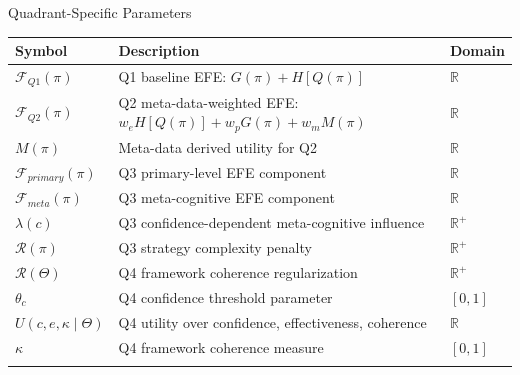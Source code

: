 \documentclass[
  ignorenonframetext,
]{beamer}
\newcounter{none} %
\begin{document}
\begin{frame}{Quadrant-Specific Parameters}
\protect{}\label{quadrant-specific-parameters}
{\def\LTcaptype{none} %
\begin{longtable}[]{@{}
  >{\raggedright\arraybackslash}p{}
  >{\raggedright\arraybackslash}p{}
  >{\raggedright\arraybackslash}p{}@{}}
\toprule\noalign{}
\begin{minipage}[b]{\linewidth}\raggedright
Symbol
\end{minipage} & \begin{minipage}[b]{\linewidth}\raggedright
Description
\end{minipage} & \begin{minipage}[b]{\linewidth}\raggedright
Domain
\end{minipage} \\
\midrule\noalign{}
\endhead
\(\mathcal{F}_{Q1}(\pi)\) & Q1 baseline EFE: \(G(\pi) + H[Q(\pi)]\) &
\(\mathbb{R}\) \\
\(\mathcal{F}_{Q2}(\pi)\) & Q2 meta-data-weighted EFE:
\(w_e H[Q(\pi)] + w_p G(\pi) + w_m M(\pi)\) & \(\mathbb{R}\) \\
\(M(\pi)\) & Meta-data derived utility for Q2 & \(\mathbb{R}\) \\
\(\mathcal{F}_{primary}(\pi)\) & Q3 primary-level EFE component &
\(\mathbb{R}\) \\
\(\mathcal{F}_{meta}(\pi)\) & Q3 meta-cognitive EFE component &
\(\mathbb{R}\) \\
\(\lambda(c)\) & Q3 confidence-dependent meta-cognitive influence &
\(\mathbb{R}^+\) \\
\(\mathcal{R}(\pi)\) & Q3 strategy complexity penalty &
\(\mathbb{R}^+\) \\
\(\mathcal{R}(\Theta)\) & Q4 framework coherence regularization &
\(\mathbb{R}^+\) \\
\(\theta_c\) & Q4 confidence threshold parameter & \([0,1]\) \\
\(U(c, e, \kappa \mid \Theta)\) & Q4 utility over confidence,
effectiveness, coherence & \(\mathbb{R}\) \\
\(\kappa\) & Q4 framework coherence measure & \([0,1]\) \\
\bottomrule\noalign{}
\end{longtable}
}
\end{frame}
\end{document}
